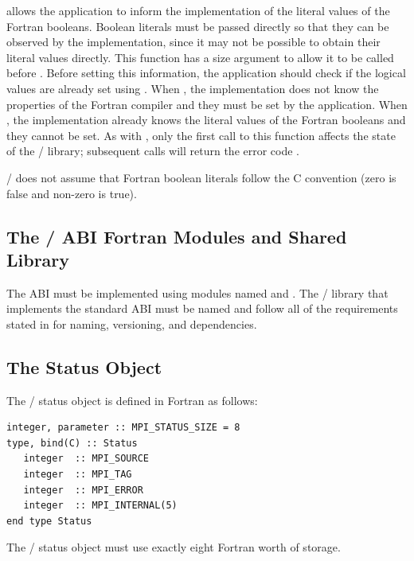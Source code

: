  allows the application
to inform the implementation of the literal values of the Fortran booleans.
Boolean literals must be passed directly so that they can be observed
by the implementation, since it may not be possible to obtain their
literal values directly.
This function has a size argument to allow it to be called before
.
Before setting this information, the application should
check if the logical values are already set
using .
When , the implementation
does not know the properties of the Fortran compiler and they
must be set by the application.
When , the implementation
already knows the literal values of the Fortran booleans
and they cannot be set.
As with , only the first call
to this function affects the state of the \MPI/ library; subsequent
calls will return the error code .

\begin{rationale}
\MPI/ does not assume that Fortran boolean literals follow the C
convention (zero is false and non-zero is true).
\end{rationale}

\subsection{The \texorpdfstring{\MPI/}{MPI} ABI Fortran Modules and Shared Library}
\label{subsec:fortran-abi-names}

The ABI must be implemented using modules named  and .
The \MPI/ library that implements the standard ABI must be
named  and follow all of the requirements stated in
 for naming, versioning, and dependencies.

\subsection{The Status Object}
\label{subsec:fortran-abi-status}

The \MPI/ status object is defined in Fortran as follows:
\begin{lstlisting}[language={[MPI]Fortran}]
integer, parameter :: MPI_STATUS_SIZE = 8
type, bind(C) :: Status
   integer  :: MPI_SOURCE
   integer  :: MPI_TAG
   integer  :: MPI_ERROR
   integer  :: MPI_INTERNAL(5)
end type Status
\end{lstlisting}
The \MPI/ status object must use exactly eight Fortran  worth of storage.


